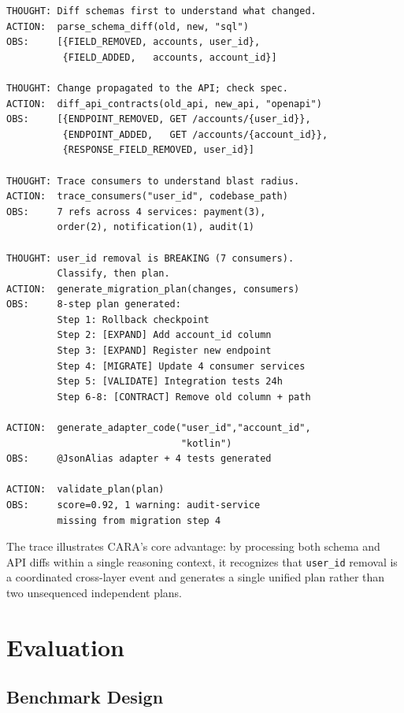 \documentclass[10pt,twocolumn]{article}
\begin{document}
\begin{lstlisting}[caption={CARA reasoning trace for Case 01 (abbreviated).},
                   label={lst:trace}]
THOUGHT: Diff schemas first to understand what changed.
ACTION:  parse_schema_diff(old, new, "sql")
OBS:     [{FIELD_REMOVED, accounts, user_id},
          {FIELD_ADDED,   accounts, account_id}]

THOUGHT: Change propagated to the API; check spec.
ACTION:  diff_api_contracts(old_api, new_api, "openapi")
OBS:     [{ENDPOINT_REMOVED, GET /accounts/{user_id}},
          {ENDPOINT_ADDED,   GET /accounts/{account_id}},
          {RESPONSE_FIELD_REMOVED, user_id}]

THOUGHT: Trace consumers to understand blast radius.
ACTION:  trace_consumers("user_id", codebase_path)
OBS:     7 refs across 4 services: payment(3),
         order(2), notification(1), audit(1)

THOUGHT: user_id removal is BREAKING (7 consumers).
         Classify, then plan.
ACTION:  generate_migration_plan(changes, consumers)
OBS:     8-step plan generated:
         Step 1: Rollback checkpoint
         Step 2: [EXPAND] Add account_id column
         Step 3: [EXPAND] Register new endpoint
         Step 4: [MIGRATE] Update 4 consumer services
         Step 5: [VALIDATE] Integration tests 24h
         Step 6-8: [CONTRACT] Remove old column + path

ACTION:  generate_adapter_code("user_id","account_id",
                               "kotlin")
OBS:     @JsonAlias adapter + 4 tests generated

ACTION:  validate_plan(plan)
OBS:     score=0.92, 1 warning: audit-service
         missing from migration step 4
\end{lstlisting}

The trace illustrates CARA's core advantage: by processing both schema and API
diffs within a single reasoning context, it recognizes that \texttt{user\_id}
removal is a coordinated cross-layer event and generates a single unified plan
rather than two unsequenced independent plans.

\section{Evaluation}

\subsection{Benchmark Design}
\end{document}

